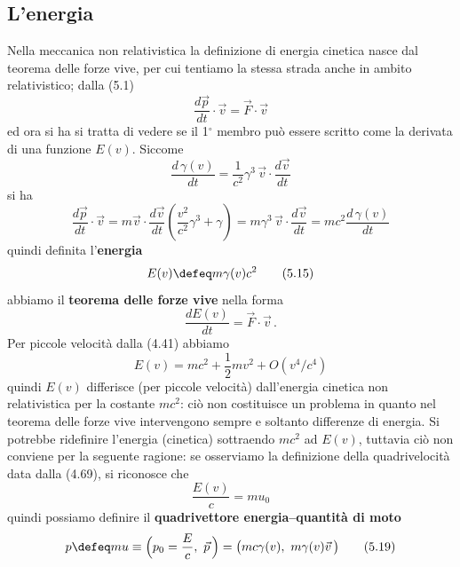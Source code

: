 \subsection{L'energia}

Nella meccanica non relativistica la definizione di energia cinetica nasce dal
teorema delle forze vive, per cui tentiamo la stessa strada anche in ambito
relativistico; dalla (5.1)
\begin{equation}
  \frac{d\vec p}{dt}\cdot\vec v=\vec F\cdot\vec v
  \tag{5.12}
\end{equation}
ed ora si ha si tratta di vedere se il 1$^\circ$ membro pu\`o essere scritto
come la derivata di una funzione $E(v)$. Siccome
\begin{equation}
  \frac{d\,\gamma(v)}{dt}=\frac{1}{c^2}\gamma^3\,\vec v\cdot\frac{d\vec v}{dt}
  \tag{5.13}
\end{equation}
si ha
\begin{equation}
  \frac{d\vec p}{dt}\cdot\vec v
  =m\vec v\cdot\frac{d\vec v}{dt}\left(\frac{v^2}{c^2}\gamma^3+\gamma\right)
  =m\gamma^3\,\vec v\cdot\frac{d\vec v}{dt}=mc^2\frac{d\,\gamma(v)}{dt}
  \tag{5.14}
\end{equation}
quindi definita l'\textbf{energia}
\begin{equation}
  E(v)\defeq m\gamma(v)c^2
  \tag{5.15}
\end{equation}
abbiamo il \textbf{teorema delle forze vive} nella forma
\begin{equation}
  \frac{dE(v)}{dt}=\vec F\cdot\vec v\,.
  \tag{5.16}
\end{equation}
Per piccole velocit\`a dalla (4.41) abbiamo
\begin{equation}
  E(v)=mc^2+\frac{1}{2}mv^2+O(v^4/c^4)
  \tag{5.17}
\end{equation}
quindi $E(v)$ differisce (per piccole velocit\`a) dall'energia cinetica non
relativistica per la costante $mc^2$: ci\`o non costituisce un problema in
quanto nel teorema delle forze vive intervengono sempre e soltanto differenze di
energia. Si potrebbe ridefinire l'energia (cinetica) sottraendo $mc^2$ ad
$E(v)$, tuttavia ci\`o non conviene per la seguente ragione: se osserviamo la
definizione della quadrivelocit\`a data dalla (4.69), si riconosce che
\begin{equation}
  \frac{E(v)}{c}=mu_0
  \tag{5.18}
\end{equation}
quindi possiamo definire il \textbf{quadrivettore energia--quantit\`a di moto}
\begin{equation}
  p\defeq mu\equiv\Big(p_0=\frac{E}{c},\ \vec p\,\Big)
  =\big(mc\gamma(v),\ m\gamma(v)\vec v\,\big)
  \tag{5.19}
\end{equation}
